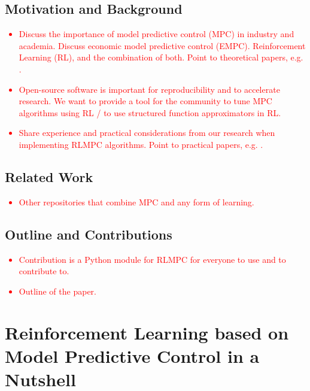 \documentclass{ifacconf}
\begin{document}
\subsection{Motivation and Background}

\textcolor{red}{
   \begin{itemize}
      \item Discuss the importance of model predictive control (MPC) in industry and academia. Discuss economic model predictive control (EMPC). Reinforcement Learning (RL), and the combination of both. Point to theoretical papers, e.g. \cite{Gros2020}.
      \item Open-source software is important for reproducibility and to accelerate research. We want to provide a tool for the community to tune MPC algorithms using RL / to use structured function approximators in RL.
      \item Share experience and practical considerations from our research when implementing RLMPC algorithms. Point to practical papers, e.g. \citep{Wenqi2021CDCgrid,Wenqi2021CDCShip}.
   \end{itemize}
}



\subsection{Related Work}

\textcolor{red}{
   \begin{itemize}
      \item Other repositories that combine MPC and any form of learning.
   \end{itemize}
}

\subsection{Outline and Contributions}

\textcolor{red}{
   \begin{itemize}
      \item Contribution is a Python module for RLMPC for everyone to use and to contribute to.
      \item Outline of the paper.
   \end{itemize}
}

\section{Reinforcement Learning based on Model Predictive Control in a Nutshell}
\end{document}
